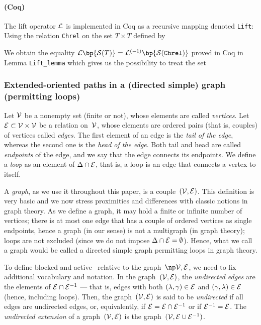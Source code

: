 \documentclass[12pt]{article}
\begin{document}
\paragraph{(Coq)} The lift operator ${\cal L}$ is implemented in Coq as a recursive mapping denoted
\texttt{Lift}: {\small {} }
Using the relation \texttt{Chrel} on the set $T{\times}T$  defined by 
{\small {} 
We obtain the equality $\Lift\bp{\Sequence(T)}= \Lift^{(-1)}\bp{ \Sequence(\texttt{Chrel})}$ proved in Coq in 
Lemma \texttt{Lift\_lemma} which gives us the possibility to treat the set 
{\small {} 

\subsubsection{Extended-oriented paths in a (directed simple) graph (permitting loops)}

Let ${\cal V}$ be a nonempty set (finite or not), whose elements are called \emph{vertices}.  Let
\( {\cal E} \subset {\cal V}\times{\cal V} \) be a relation on~${\cal V}$, whose
elements are ordered pairs (that is, couples) of vertices called \emph{edges}.
The first element of an edge is the \emph{tail of the edge},
whereas the second one is the \emph{head of the edge}.
Both tail and head are called \emph{endpoints} of the edge,
and we say that the edge connects its endpoints.
We define a \emph{loop} %
as an element of \( \Delta \cap {\cal E} \), that is, a loop is an edge that
connects a vertex to itself.

A \emph{graph}, as we use it throughout this paper, is a
couple~$({\cal V},{\cal E})$.
This definition is very basic and we now stress proximities and differences with
classic notions in graph theory.
As we define a graph, it may hold a finite or infinite number of vertices;
there is at most one edge that has a couple of ordered vertices as single endpoints,
hence a graph (in our sense) is not a multigraph (in graph theory);
loops are not excluded (since we do not impose $\Delta \cap {\cal E}=\emptyset$).
Hence, what we call a graph would be called a directed simple graph permitting
loops in graph theory. 

To define blocked and active \undirectedEdgePaths\ relative to the
graph~\( \npOrientedGraph \), we need to fix additional vocabulary and
notation.
In the graph~$({\cal V},{\cal E})$, 
the \emph{undirected edges} are the elements of ${\cal E} \cap {\cal E}^{-1}$
--- that is, edges with both $(\lambda,\gamma)\in {\cal E}$
and $(\gamma, \lambda)\in {\cal E}$ (hence, including loops).
Then, the graph~$({\cal V},{\cal E})$ is said to be \emph{undirected} if
all edges are undirected edges, 
or, equivalently, if \( {\cal E}={\cal E} \cap {\cal E}^{-1} \)
or if \( {\cal E}^{-1} = {\cal E} \).
The \emph{undirected extension} of a graph~$({\cal V},{\cal E})$
is the graph~$({\cal V},{\cal E} \cup {\cal E}^{-1})$.

}}
\end{document}
